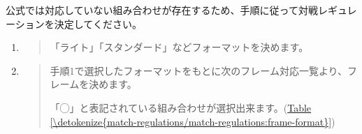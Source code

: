 \documentclass[letterpaper,10pt,dvipdfmx]{sphinxmanual}
\begin{document}
\sphinxAtStartPar
公式では対応していない組み合わせが存在するため、手順に従って対戦レギュレーションを決定してください。
\begin{enumerate}
%
\item {} 
\sphinxAtStartPar
{}
\begin{quote}

\sphinxAtStartPar
「ライト」「スタンダード」などフォーマットを決めます。
\end{quote}

\item {} 
\sphinxAtStartPar
{}
\begin{quote}

\sphinxAtStartPar
手順1で選択したフォーマットをもとに次のフレーム対応一覧より、フレームを決めます。

\sphinxAtStartPar
「◯」と表記されている組み合わせが選択出来ます。(\hyperref[\detokenize{match-regulations/match-regulations:frame-format}]{Table \ref{\detokenize{match-regulations/match-regulations:frame-format}}})



\end{quote}
\end{enumerate}
\end{document}
